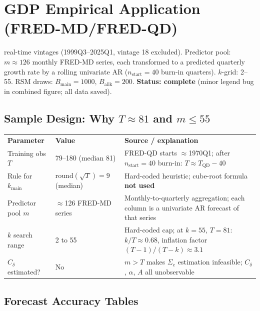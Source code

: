 \documentclass[11pt,a4paper]{article}
\newcommand{\Sige}{\Sigma_e}
\begin{document}
\section{GDP Empirical Application (FRED-MD/FRED-QD)}

 real-time vintages (1999Q3--2025Q1, vintage 18 excluded).
Predictor pool: \(m\approx126\) monthly FRED-MD series, each transformed to a predicted
quarterly growth rate by a rolling univariate AR (\(n_{\mathrm{start}}=40\) burn-in quarters).
\(k\)-grid: 2--55. RSM draws: \(B_{\mathrm{main}}=1000\), \(B_{\mathrm{allk}}=200\).
\textbf{Status: complete} (minor legend bug in combined figure; all data saved).

\subsection{Sample Design: Why \(T\approx81\) and \(m\le55\)}

\smallskip
\begin{tabular}{L{2.4cm} L{3.8cm} L{8.0cm}}
\color{white}\bfseries Parameter &
\color{white}\bfseries Value &
\color{white}\bfseries Source / explanation \\
Training obs \(T\) & 79--180 (median 81) &
  FRED-QD starts \(\approx\)1970Q1; after \(n_{\mathrm{start}}=40\) burn-in: \(T\approx T_{\mathrm{QD}}-40\) \\
Rule for \(k_{\mathrm{main}}\) & \(\mathrm{round}(\sqrt{T})=9\) (median) &
  Hard-coded heuristic; cube-root formula \textbf{not used} \\
Predictor pool \(m\) & \(\approx\)126 FRED-MD series &
  Monthly-to-quarterly aggregation; each column is a univariate AR forecast of that series \\
\(k\) search range & 2 to 55 &
  Hard-coded cap; at \(k=55\), \(T=81\): \(k/T\approx0.68\), inflation factor \((T-1)/(T-k)\approx3.1\) \\
\(C_\delta\) estimated? & No &
  \(m>T\) makes \(\Sige\) estimation infeasible; \(C_\delta\), \(\alpha\), \(A\) all unobservable \\
\end{tabular}

\subsection{Forecast Accuracy Tables}
\end{document}
